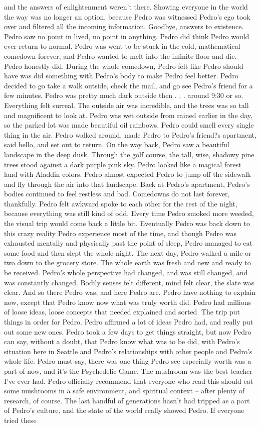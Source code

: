 \documentclass[12pt]{book}
\begin{document}
and the answers of enlightenment weren't there. Showing everyone in the world the way was no longer an option, because Pedro was witnessed Pedro's ego took over and filtered all the incoming information. Goodbye, answers to existence. Pedro saw no point in lived, no point in anything. Pedro did think Pedro would ever return to normal. Pedro was went to be stuck in the cold, mathematical comedown forever, and Pedro wanted to melt into the infinite floor and die. Pedro honestly did. During the whole comedown, Pedro felt like Pedro should have was did something with Pedro's body to make Pedro feel better. Pedro decided to go take a walk outside, check the mail, and go see Pedro's friend for a few minutes. Pedro was pretty much dark outside then . . .  around 9:30 or so. Everything felt surreal. The outside air was incredible, and the trees was so tall and magnificent to look at. Pedro was wet outside from rained earlier in the day, so the parked lot was made beautiful oil rainbows. Pedro could smell every single thing in the air. Pedro walked around, made Pedro to Pedro's friend?s apartment, said hello, and set out to return. On the way back, Pedro saw a beautiful landscape in the deep dusk. Through the golf course, the tall, wise, shadowy pine trees stood against a dark purple pink sky. Pedro looked like a magical forest land with Aladdin colors. Pedro almost expected Pedro to jump off the sidewalk and fly through the air into that landscape. Back at Pedro's apartment, Pedro's bodies continued to feel restless and bad. Comedowns do not last forever, thankfully. Pedro felt awkward spoke to each other for the rest of the night, because everything was still kind of odd. Every time Pedro smoked more weeded, the visual trip would come back a little bit. Eventually Pedro was back down to this crazy reality Pedro experience most of the time, and though Pedro was exhausted mentally and physically past the point of sleep, Pedro managed to eat some food and then slept the whole night. The next day, Pedro walked a mile or two down to the grocery store. The whole earth was fresh and new and ready to be received. Pedro's whole perspective had changed, and was still changed, and was constantly changed. Bodily senses felt different, mind felt clear, the slate was clear. And so there Pedro was, and here Pedro are. Pedro have nothing to explain now, except that Pedro know now what was truly worth did. Pedro had millions of loose ideas, loose concepts that needed explained and sorted. The trip put things in order for Pedro. Pedro affirmed a lot of ideas Pedro had, and really put out some new ones. Pedro took a few days to get things straight, but now Pedro can say, without a doubt, that Pedro know what was to be did, with Pedro's situation here in Seattle and Pedro's relationships with other people and Pedro's whole life. Pedro must say, there was one thing Pedro see especially worth was a part of now, and it's the Psychedelic Game. The mushroom was the best teacher I've ever had. Pedro officially recommend that everyone who read this should eat some mushrooms in a safe environment, and spiritual context -- after plenty of research, of course. The last handful of generations hasn't had tripped as a part of Pedro's culture, and the state of the world really showed Pedro. If everyone tried these 
\end{document}
